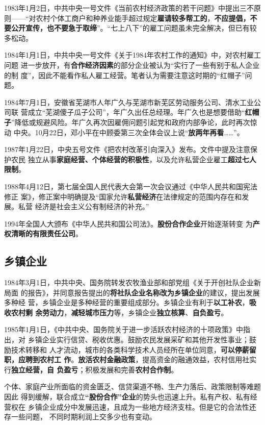 1983年1月2日，中共中央一号文件《当前农村经济政策的若干问题》中提出三不原
则——“对农村个体工商户和种养业能手超过规定\textbf{雇请较多帮工的}，\textbf{不应提倡，不
  要公开宣传，也不要急于取缔}”。“七上八下”的雇工问题虽未完全解决，但已有较
多松动。

1984年1月1日，中共中央一号文件《关于1984年农村工作的通知》中，对农村雇工问题
进一步放开，有\textbf{合作经济因素}的部分企业被认为“实行了一些有别于私人企业的制
度”，因此不能看作私人雇工经营。笔者认为需要注意这时期的“红帽子”问题。

1984年7月1日，安徽省芜湖市人年广久与芜湖市新芜区劳动服务公司、清水工业公司联
营成立“芜湖傻子瓜子公司”，年广久出任总经理。年广久也是想要借助“\textbf{红帽
  子}”降低或规避风险。年广久再次因雇佣问题引起党和政府内部争论，此时再次惊动
中央。10月22日，邓小平在中顾委第三次全体会议上说“\textbf{放两年再看}……”。

1987年1月22日，中央五号文件《把农村改革引向深入》发布。文件中提及注意保护农民
独立从事\textbf{家庭经营、个体经营的积极性}，以及允许私营企业雇工\textbf{超过七人限制}。

1988年4月12日，第七届全国人民代表大会第一次会议通过《中华人民共和国宪法修正
案》，修正案中明确提及“国家允许\textbf{私营经济}在法律规定的范围内存在和发展。私营
经济是社会主义公有制经济的补充。”

1994年全国人大颁布《中华人民共和国公司法》。\textbf{股份合作企业}开始逐渐转变
为\textbf{产权清晰的有限责任公司}。

\subsection{乡镇企业}




1984年3月1日，中共中央、国务院转发农牧渔业部和部党组《关于开创社队企业新局面
的报告》，并同意报告提出的\textbf{将社队企业名称改为乡镇企业}的建议，提出发展多种经
营，乡镇企业是多种经营的重要组成部分。乡镇企业有利于\textbf{以工补农}，\textbf{吸收农村剩
  余劳动力}，\textbf{减轻城市压力}等，乡镇企业\textbf{独立核算}、\textbf{自负盈亏}。

1985年1月1日，《中共中央、国务院关于进一步活跃农村经济的十项政策》中指出，对
乡镇企业实行信贷、税收优惠。鼓励农民发展采矿和其他开发性事业；鼓励技术转移和
人才流动，城市的各类科学技术人员经所在单位同意，\textbf{可以停薪留职，应聘到农村工
  作}。\textbf{放活农村金融政策}，提高资金的融通效益，农村信用社实行\textbf{独立经营，自
  负盈亏}；积极发展和完善\textbf{农村合作制}。

个体、家庭产业所面临的资金匮乏、信贷渠道不畅、生产力落后、政策限制等难题因此
得到缓解，联合成立\textbf{“股份合作”企业}的势头也迅速上升。私有产权、私有经营权在
乡镇企业成分中发展迅速，且成为一些地方经济支柱。但是它的合法性还存一些问题，
不同时期利润上交多少也有变动。

